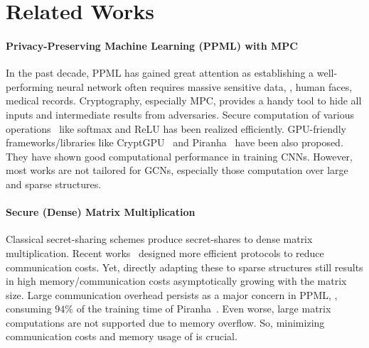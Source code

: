 
\section{Related Works}
\label{supp::work}
 
\paragraph{Privacy-Preserving Machine Learning (PPML) with MPC}
In the past decade, PPML has gained great attention as establishing a well-performing neural network often requires massive sensitive data, \eg, human faces, medical records.
Cryptography, especially MPC,
provides a handy tool to 
hide all inputs and intermediate results from adversaries.
Secure computation of various operations~\cite{ndss/ABY15,ccs/ABY318,neurips/crypten2020,ccs/RatheeRKCGRS20,sp21/TanKTW,uss/WatsonWP22,acsac/0021ZCPTLY23,adma/ZhengSDCLZW23} like softmax
and ReLU has been realized efficiently.
GPU-friendly frameworks/libraries like %
CryptGPU~\cite{sp21/TanKTW} and Piranha~\cite{uss/WatsonWP22} have been also proposed.
They have shown good computational performance in training CNNs.
However, most works are not tailored for %
GCNs, especially those computation over large and sparse structures.

\paragraph{Secure (Dense) Matrix Multiplication}
Classical secret-sharing schemes produce secret-shares to dense matrix multiplication.
Recent works~\cite{sp/MohasselZ17,asiaccs/MonoG23,asiacrypt/0030KRRSW20,ccs/JiangKLS18} designed more efficient protocols to reduce communication costs.
Yet, directly adapting these to sparse structures still results in high memory/communication costs asymptotically growing with the matrix size.
Large communication overhead persists as a major concern in PPML, \eg, consuming $94\%$ of the training time of Piranha~\cite{uss/WatsonWP22}.
Even worse, large matrix computations are not supported due to memory overflow.
So, minimizing communication costs and memory usage of \osmm is crucial.

